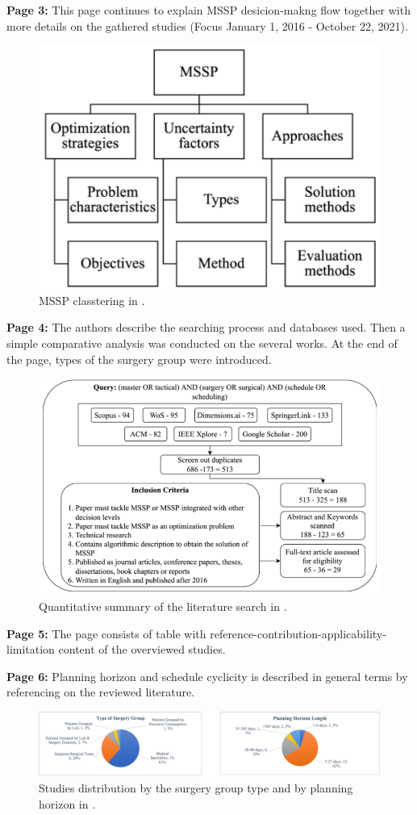     \textbf{Page 3:}
    This page continues to explain MSSP desicion-makng flow together with more details on the gathered studies (Focus January 1, 2016 - October 22, 2021).
    \begin{figure}[H]
        \centering
        \includegraphics[width=.6\textwidth]{figures/0007_SR01MY22/fig1.png}
        \caption{MSSP classtering in \cite{x236}.}
        \label{fig1:0007_SR01MY22}
    \end{figure}

    \textbf{Page 4:}
    The authors describe the searching process and databases used. Then a simple comparative analysis was conducted on the several works. At the end of the page, types of the surgery group were introduced. 
    \begin{figure}[H]
        \centering
        \includegraphics[width=.8\textwidth]{figures/0007_SR01MY22/fig2.png}
        \caption{Quantitative summary of the literature search in \cite{x236}.}
        \label{fig2:0007_SR01MY22}
    \end{figure}

    \textbf{Page 5:}
    The page consists of table with reference-contribution-applicability-limitation content of the overviewed studies.

    \textbf{Page 6:}
    Planning horizon and schedule cyclicity is described in general terms by referencing on the reviewed literature.
    \begin{figure}[H]
        \centering
        \includegraphics[width=1\textwidth]{figures/0007_SR01MY22/fig3.png}
        \caption{Studies distribution by the surgery group type and by planning horizon in \cite{x236}.}
        \label{fig3:0007_SR01MY22}
    \end{figure}

